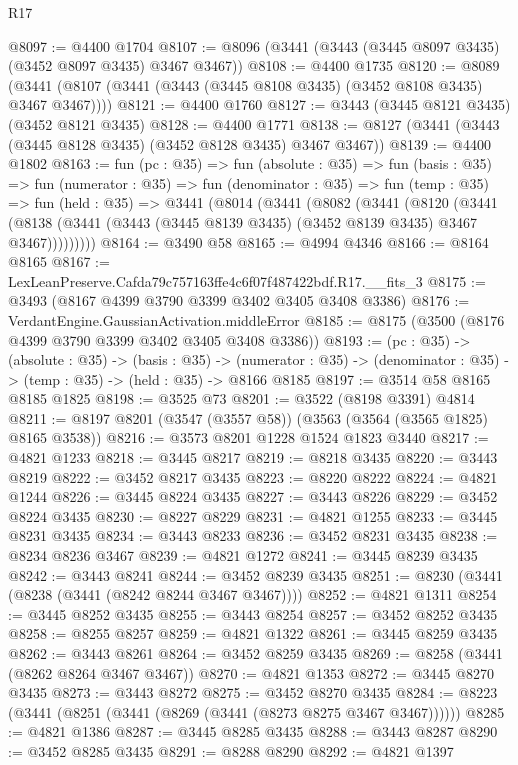 \begin{lexlean}{R17}
\begin{coremodule}
@8097 := @4400 @1704
@8107 := @8096 (@3441 (@3443 (@3445 @8097 @3435) (@3452 @8097 @3435) @3467 @3467))
@8108 := @4400 @1735
@8120 := @8089 (@3441 (@8107 (@3441 (@3443 (@3445 @8108 @3435) (@3452 @8108 @3435) @3467 @3467))))
@8121 := @4400 @1760
@8127 := @3443 (@3445 @8121 @3435) (@3452 @8121 @3435)
@8128 := @4400 @1771
@8138 := @8127 (@3441 (@3443 (@3445 @8128 @3435) (@3452 @8128 @3435) @3467 @3467))
@8139 := @4400 @1802
@8163 := fun (pc : @35) =>
  fun (absolute : @35) =>
  fun (basis : @35) =>
  fun (numerator : @35) =>
  fun (denominator : @35) =>
  fun (temp : @35) =>
  fun (held : @35) =>
  @3441
    (@8014
      (@3441
        (@8082
          (@3441
            (@8120
              (@3441
                (@8138 (@3441 (@3443 (@3445 @8139 @3435) (@3452 @8139 @3435) @3467 @3467)))))))))
@8164 := @3490 @58
@8165 := @4994 @4346
@8166 := @8164 @8165
@8167 := LexLeanPreserve.Cafda79c757163ffe4c6f07f487422bdf.R17.__fits_3
@8175 := @3493 (@8167 @4399 @3790 @3399 @3402 @3405 @3408 @3386)
@8176 := VerdantEngine.GaussianActivation.middleError
@8185 := @8175 (@3500 (@8176 @4399 @3790 @3399 @3402 @3405 @3408 @3386))
@8193 := (pc : @35) ->
  (absolute : @35) ->
  (basis : @35) ->
  (numerator : @35) -> (denominator : @35) -> (temp : @35) -> (held : @35) -> @8166 @8185
@8197 := @3514 @58 @8165 @8185 @1825
@8198 := @3525 @73
@8201 := @3522 (@8198 @3391) @4814
@8211 := @8197 @8201 (@3547 (@3557 @58)) (@3563 (@3564 (@3565 @1825) @8165 @3538))
@8216 := @3573 @8201 @1228 @1524 @1823 @3440
@8217 := @4821 @1233
@8218 := @3445 @8217
@8219 := @8218 @3435
@8220 := @3443 @8219
@8222 := @3452 @8217 @3435
@8223 := @8220 @8222
@8224 := @4821 @1244
@8226 := @3445 @8224 @3435
@8227 := @3443 @8226
@8229 := @3452 @8224 @3435
@8230 := @8227 @8229
@8231 := @4821 @1255
@8233 := @3445 @8231 @3435
@8234 := @3443 @8233
@8236 := @3452 @8231 @3435
@8238 := @8234 @8236 @3467
@8239 := @4821 @1272
@8241 := @3445 @8239 @3435
@8242 := @3443 @8241
@8244 := @3452 @8239 @3435
@8251 := @8230 (@3441 (@8238 (@3441 (@8242 @8244 @3467 @3467))))
@8252 := @4821 @1311
@8254 := @3445 @8252 @3435
@8255 := @3443 @8254
@8257 := @3452 @8252 @3435
@8258 := @8255 @8257
@8259 := @4821 @1322
@8261 := @3445 @8259 @3435
@8262 := @3443 @8261
@8264 := @3452 @8259 @3435
@8269 := @8258 (@3441 (@8262 @8264 @3467 @3467))
@8270 := @4821 @1353
@8272 := @3445 @8270 @3435
@8273 := @3443 @8272
@8275 := @3452 @8270 @3435
@8284 := @8223 (@3441 (@8251 (@3441 (@8269 (@3441 (@8273 @8275 @3467 @3467))))))
@8285 := @4821 @1386
@8287 := @3445 @8285 @3435
@8288 := @3443 @8287
@8290 := @3452 @8285 @3435
@8291 := @8288 @8290
@8292 := @4821 @1397

\end{coremodule}
\end{lexlean}

